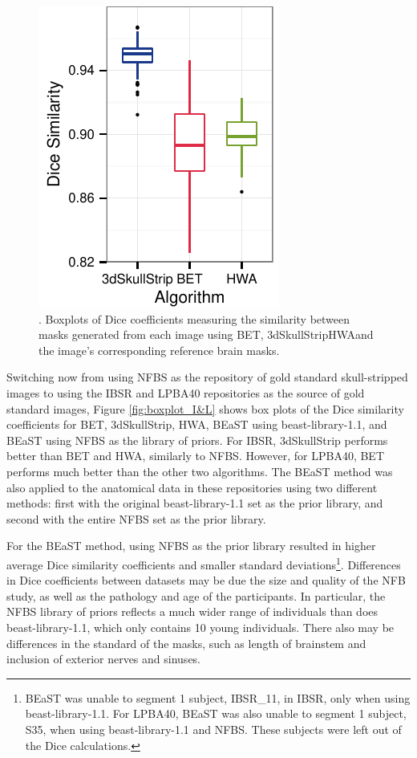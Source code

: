 \begin{figure}[h!]
    \includegraphics[]{boxplot_nfbs.pdf}
    \caption{. Boxplots of Dice coefficients measuring the similarity between masks generated from each image using BET, 3dSkullStrip\DIFaddbeginFL \DIFaddFL{, }\DIFaddendFL HWA\DIFaddbeginFL \DIFaddFL{, }\DIFaddendFL and the image's corresponding reference brain masks. }
    \label{fig:boxplot_NFBS}
\end{figure}

Switching now from using NFBS as the repository of gold standard skull-stripped images to using the IBSR and LPBA40 repositories as the source of gold standard images, Figure \ref{fig:boxplot_I&L} shows box plots of the Dice similarity coefficients for BET, 3dSkullStrip, HWA, BEaST using beast-library-1.1, and BEaST using NFBS as the library of priors. For IBSR, 3dSkullStrip performs better than BET and HWA, similarly to NFBS. However, for LPBA40, BET performs much better than the other two algorithms. The BEaST method was also applied to the anatomical data in these repositories using two different methods: first with the original beast-library-1.1 set as the prior library, and second with the entire NFBS set as the prior library.

For the BEaST method, using NFBS as the prior library resulted in higher average Dice similarity coefficients and smaller standard deviations\footnote{BEaST was unable to segment 1 subject, IBSR\_11, in IBSR, only when using beast-library-1.1. For LPBA40, BEaST was also unable to segment 1 subject, S35, when using beast-library-1.1 and NFBS. These subjects were left out of the Dice calculations.}. Differences in Dice coefficients between datasets may be due the size and quality of the NFB study, as well as the pathology and age of the participants. In particular, the NFBS library of priors reflects a much wider range of individuals than does beast-library-1.1, which only contains 10 young individuals. There also may be differences in the standard of the masks, such as length of brainstem and inclusion of exterior nerves and sinuses.

